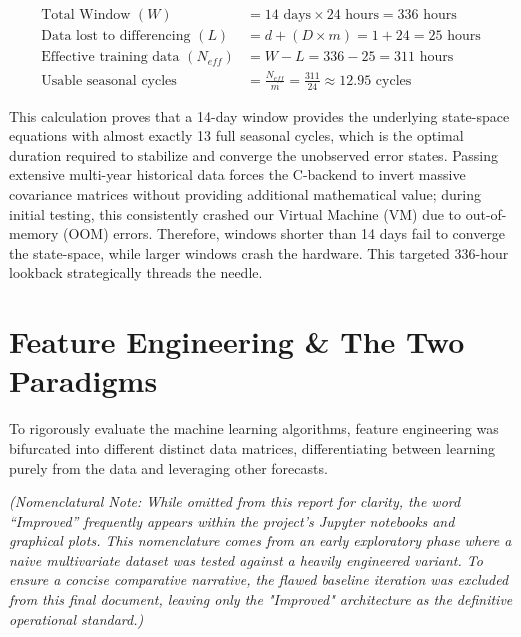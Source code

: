 \documentclass{article}
\begin{document}
$$
\begin{aligned}
\text{Total Window } (W) &= 14 \text{ days} \times 24 \text{ hours} = 336 \text{ hours} \\
\text{Data lost to differencing } (L) &= d + (D \times m) = 1 + 24 = 25 \text{ hours} \\
\text{Effective training data } (N_{eff}) &= W - L = 336 - 25 = 311 \text{ hours} \\
\text{Usable seasonal cycles} &= \frac{N_{eff}}{m} = \frac{311}{24} \approx 12.95 \text{ cycles}
\end{aligned}
$$

This calculation proves that a 14-day window provides the underlying state-space equations with almost exactly 13 full seasonal cycles, which is the optimal duration required to stabilize and converge the unobserved error states. Passing extensive multi-year historical data forces the C-backend to invert massive covariance matrices without providing additional mathematical value; during initial testing, this consistently crashed our Virtual Machine (VM) due to out-of-memory (OOM) errors. Therefore, windows shorter than 14 days fail to converge the state-space, while larger windows crash the hardware. This targeted 336-hour lookback strategically threads the needle.

\section{Feature Engineering \& The Two Paradigms}

To rigorously evaluate the machine learning algorithms, feature engineering was bifurcated into different distinct data matrices, differentiating between learning purely from the data and leveraging other forecasts. 

\textit{(Nomenclatural Note: While omitted from this report for clarity, the word ``Improved'' frequently appears within the project's Jupyter notebooks and graphical plots. This nomenclature comes from an early exploratory phase where a naive multivariate dataset was tested against a heavily engineered variant. To ensure a concise comparative narrative, the flawed baseline iteration was excluded from this final document, leaving only the "Improved" architecture as the definitive operational standard.)}
\end{document}
